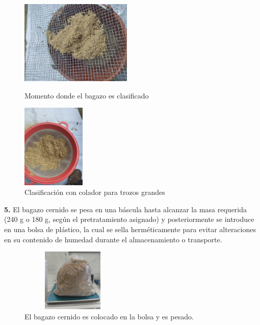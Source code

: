 \documentclass[12pt]{article}
\begin{document}
		
			\begin{figure}[H]
			\centering
			\begin{minipage}{0.46\textwidth}
				\centering
			\includegraphics[width=\linewidth, height=4cm, keepaspectratio]{imagenes/cernir_bagazo_2}
			\caption{Momento donde el bagazo es clasificado}
			\label{cernir_bagazo_2C}
			\end{minipage}
			\hfill
			\begin{minipage}{0.48\textwidth}
				\centering
				\includegraphics[width=\linewidth, height=4cm, keepaspectratio]{imagenes/cernir_bagazo_cedazo}
				\caption{Clasificación con colador para trozos grandes}
				\label{cernir_bagazo_cedazo}
			\end{minipage}
		\end{figure}
		
	
			\textbf{5.} El bagazo cernido se pesa en una báscula hasta alcanzar la masa requerida (240 g o 180 g, según el pretratamiento asignado) y posteriormente se introduce en una bolsa de plástico, la cual se sella herméticamente para evitar alteraciones en su contenido de humedad durante el almacenamiento o transporte.
			
			
			\begin{figure} [H]
				\centering
				\includegraphics[width=5cm, height=3cm]{imagenes/cernir_bagazo_pesado}
				\caption{El bagazo cernido es colocado en la bolsa y es pesado.}
				\label{cernir_bagazo_pesado}
			\end{figure}
			
\end{document}

